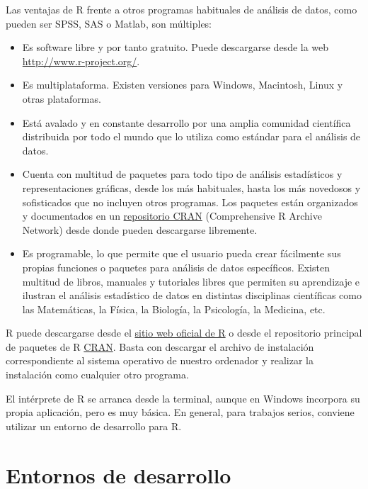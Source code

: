 \documentclass[
  a4paper,
]{scrreport}
\providecommand{\tightlist}{%
  \setlength{\itemsep}{0pt}\setlength{\parskip}{0pt}}\usepackage{longtable,booktabs,array}
\theoremstyle{definition}
\theoremstyle{remark}
\begin{document}
Las ventajas de R frente a otros programas habituales de análisis de
datos, como pueden ser SPSS, SAS o Matlab, son múltiples:

\begin{itemize}
\tightlist
\item
  Es software libre y por tanto gratuito. Puede descargarse desde la web
  \url{http://www.r-project.org/}.
\item
  Es multiplataforma. Existen versiones para Windows, Macintosh, Linux y
  otras plataformas.
\item
  Está avalado y en constante desarrollo por una amplia comunidad
  científica distribuida por todo el mundo que lo utiliza como estándar
  para el análisis de datos.
\item
  Cuenta con multitud de paquetes para todo tipo de análisis
  estadísticos y representaciones gráficas, desde los más habituales,
  hasta los más novedosos y sofisticados que no incluyen otros
  programas. Los paquetes están organizados y documentados en un
  \href{https://cran.r-project.org/}{repositorio CRAN} (Comprehensive R
  Archive Network) desde donde pueden descargarse libremente.
\item
  Es programable, lo que permite que el usuario pueda crear fácilmente
  sus propias funciones o paquetes para análisis de datos específicos.
  Existen multitud de libros, manuales y tutoriales libres que permiten
  su aprendizaje e ilustran el análisis estadístico de datos en
  distintas disciplinas científicas como las Matemáticas, la Física, la
  Biología, la Psicología, la Medicina, etc.
\end{itemize}

R puede descargarse desde el \href{https://www.r-project.org/}{sitio web
oficial de R} o desde el repositorio principal de paquetes de R
\href{https://cran.r-project.org/}{CRAN}. Basta con descargar el archivo
de instalación correspondiente al sistema operativo de nuestro ordenador
y realizar la instalación como cualquier otro programa.

El intérprete de R se arranca desde la terminal, aunque en Windows
incorpora su propia aplicación, pero es muy básica. En general, para
trabajos serios, conviene utilizar un entorno de desarrollo para R.

\hypertarget{entornos-de-desarrollo}{%
\section{Entornos de desarrollo}\label{entornos-de-desarrollo}}
\end{document}

